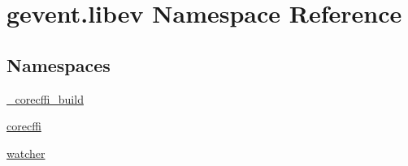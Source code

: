 \hypertarget{namespacegevent_1_1libev}{}\section{gevent.\+libev Namespace Reference}
\label{namespacegevent_1_1libev}
\subsection*{Namespaces}
\begin{DoxyCompactItemize}
\item 
 \hyperlink{namespacegevent_1_1libev_1_1__corecffi__build}{\+\_\+corecffi\+\_\+build}
\item 
 \hyperlink{namespacegevent_1_1libev_1_1corecffi}{corecffi}
\item 
 \hyperlink{namespacegevent_1_1libev_1_1watcher}{watcher}
\end{DoxyCompactItemize}

